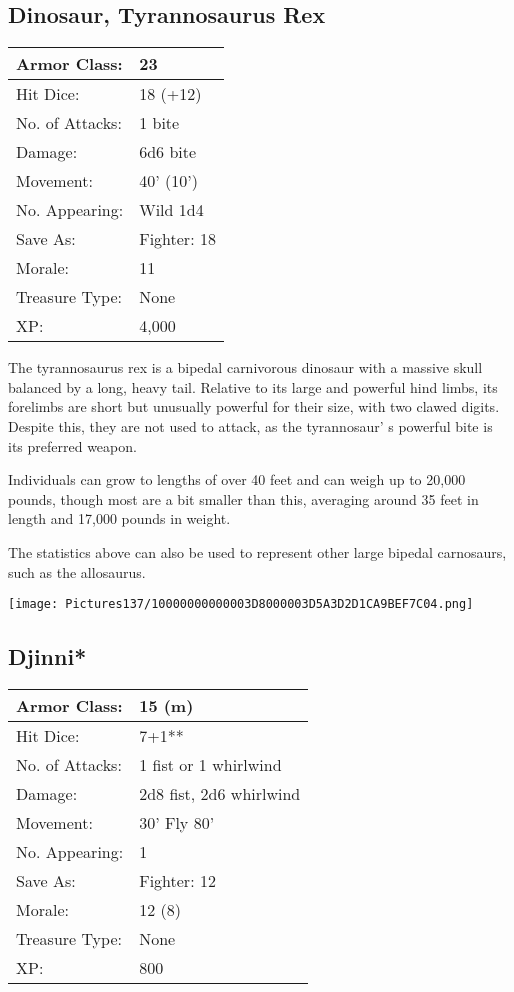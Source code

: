 \documentclass[a4paper,twoside,openany,10pt]{book}
\begin{document}
\begin{multicols}{2}
\subsection*{Dinosaur, Tyrannosaurus Rex}\label{dinosaur-tyrannosaurus-rex}


\begin{tabularx}{0.48\textwidth}{@{}lX@{}}
Armor Class: & 23 \\\hline
Hit Dice: & 18 (+12) \\\hline
No. of Attacks: & 1 bite \\\hline
Damage: & 6d6 bite \\\hline
Movement: & 40' (10') \\\hline
No. Appearing: & Wild 1d4 \\\hline
Save As: & Fighter: 18 \\\hline
Morale: & 11 \\\hline
Treasure Type: & None \\\hline
XP: & 4,000 \\\hline
\end{tabularx}\medskip

The tyrannosaurus rex is a bipedal carnivorous dinosaur with a massive skull balanced by a long, heavy tail. Relative to its large and powerful hind limbs, its forelimbs are short but unusually powerful for their size, with two clawed digits. Despite this, they are not used to attack, as the tyrannosaur' s powerful bite is its preferred weapon.

Individuals can grow to lengths of over 40 feet and can weigh up to 20,000 pounds, though most are a bit smaller than this, averaging around 35 feet in length and 17,000 pounds in weight.

The statistics above can also be used to represent other large bipedal carnosaurs, such as the allosaurus.

\begin{center}
	\texttt{[image: Pictures137/10000000000003D8000003D5A3D2D1CA9BEF7C04.png]}
\end{center}

\subsection*{Djinni*}\label{djinni}


\begin{tabularx}{0.48\textwidth}{@{}lX@{}}
Armor Class: & 15 (m) \\\hline
Hit Dice: & 7+1** \\\hline
No. of Attacks: & 1 fist or 1 whirlwind \\\hline
Damage: & 2d8 fist, 2d6 whirlwind \\\hline
Movement: & 30' Fly 80' \\\hline
No. Appearing: & 1 \\\hline
Save As: & Fighter: 12 \\\hline
Morale: & 12 (8) \\\hline
Treasure Type: & None \\\hline
XP: & 800 \\\hline
\end{tabularx}\medskip


\end{multicols}
\end{document}
